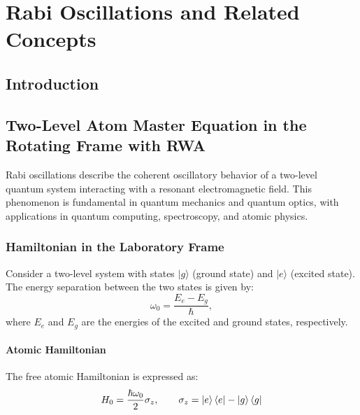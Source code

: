 
\chapter{Rabi Oscillations and Related Concepts} %

\label{chapter_rabi_oscillations} %

\section{Introduction}

\section{Two-Level Atom Master Equation in the Rotating Frame with RWA}

Rabi oscillations describe the coherent oscillatory behavior of a two-level quantum system interacting with a resonant electromagnetic field.
This phenomenon is fundamental in quantum mechanics and quantum optics, with applications in quantum computing, spectroscopy, and atomic physics.

\subsection{Hamiltonian in the Laboratory Frame}

Consider a two-level system with states \(|g\rangle\) (ground state) and \(|e\rangle\) (excited state).
The energy separation between the two states is given by:
\begin{equation}
	\omega_0 = \frac{E_e - E_g}{\hbar},
	\label{eq:EnergySeparation}
\end{equation}
where \(E_e\) and \(E_g\) are the energies of the excited and ground states, respectively.

\subsubsection{Atomic Hamiltonian}
The free atomic Hamiltonian is expressed as:
\begin{equation}
	H_0 = \frac{\hbar\omega_0}{2} \sigma_z, \qquad \sigma_z = \ket{e}\bra{e} - \ket{g}\bra{g}
	\label{eq:AtomicHamiltonian}
\end{equation}

